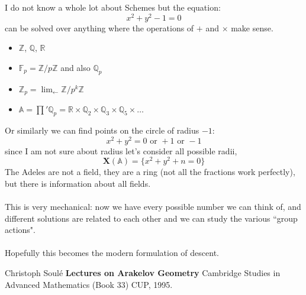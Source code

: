 \documentclass[12pt]{article}
\begin{document}
\noindent I do not know a whole lot about Schemes but the equation:
$$ x^2 + y^2 - 1 = 0 $$
can be solved over anything where the operations of $+$ and $\times$ make sense.
\begin{itemize}
\item $\mathbb{Z}$, $\mathbb{Q}$, $\mathbb{R}$
\item $\mathbb{F}_p = \mathbb{Z}/p\mathbb{Z}$ and also $\mathbb{Q}_p$
\item $\displaystyle \mathbb{Z}_p = \lim_{\longleftarrow} \mathbb{Z}/p^k\mathbb{Z}$
\item $\mathbb{A} = \prod' \mathbb{Q}_p = \mathbb{R} \times \mathbb{Q}_2 \times \mathbb{Q}_3 \times \mathbb{Q}_5 \times \dots $
\end{itemize}
Or similarly we can find points on the circle of radius $-1$:
$$x^2 +  y^2 = 0 \text{ or } + 1 \text{ or }-1 $$ 
since I am not sure about radius let's consider all possible radii,
$$ \mathbf{X}(\mathbb{A}) = \big\{ x^2 + y^2 + n = 0  \big\} $$
The Adeles are not a field, they are a ring (not all the fractions work perfectly), but there is information about all fields. \\ \\
This is very mechanical: now we have every possible number we can think of, and different solutions are related to each other and we can study the various ``group actions".  \\ \\
Hopefully this becomes the modern formulation of descent. 

\newpage

\selectfont \fontsize{12}{10}\selectfont

\begin{thebibliography}{}

\item Christoph Soul\'{e} \textbf{Lectures on Arakelov Geometry} Cambridge Studies in Advanced Mathematics (Book 33) CUP, 1995.

\end{thebibliography}
\end{document}
